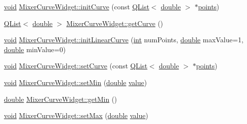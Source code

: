 \begin{DoxyCompactItemize}
\item 
\hyperlink{group___u_a_v_objects_plugin_ga444cf2ff3f0ecbe028adce838d373f5c}{void} \hyperlink{group___u_a_v_object_widget_utils_gaa776ac520f82de83862c18af0ff99ce3}{Mixer\-Curve\-Widget\-::init\-Curve} (const \hyperlink{class_q_list}{Q\-List}$<$ \hyperlink{_super_l_u_support_8h_a8956b2b9f49bf918deed98379d159ca7}{double} $>$ $\ast$\hyperlink{glext_8h_ae75d9f560170dfeaadc8718c87f5fbec}{points})
\item 
\hyperlink{class_q_list}{Q\-List}$<$ \hyperlink{_super_l_u_support_8h_a8956b2b9f49bf918deed98379d159ca7}{double} $>$ \hyperlink{group___u_a_v_object_widget_utils_gad97c9f7b189fc9097da50ab5b8f08f4d}{Mixer\-Curve\-Widget\-::get\-Curve} ()
\item 
\hyperlink{group___u_a_v_objects_plugin_ga444cf2ff3f0ecbe028adce838d373f5c}{void} \hyperlink{group___u_a_v_object_widget_utils_gad0a76288e7cbdf09fb112176d236dfde}{Mixer\-Curve\-Widget\-::init\-Linear\-Curve} (\hyperlink{ioapi_8h_a787fa3cf048117ba7123753c1e74fcd6}{int} num\-Points, \hyperlink{_super_l_u_support_8h_a8956b2b9f49bf918deed98379d159ca7}{double} max\-Value=1, \hyperlink{_super_l_u_support_8h_a8956b2b9f49bf918deed98379d159ca7}{double} min\-Value=0)
\item 
\hyperlink{group___u_a_v_objects_plugin_ga444cf2ff3f0ecbe028adce838d373f5c}{void} \hyperlink{group___u_a_v_object_widget_utils_ga0738fd8e0cf67713c6553da77c284a71}{Mixer\-Curve\-Widget\-::set\-Curve} (const \hyperlink{class_q_list}{Q\-List}$<$ \hyperlink{_super_l_u_support_8h_a8956b2b9f49bf918deed98379d159ca7}{double} $>$ $\ast$\hyperlink{glext_8h_ae75d9f560170dfeaadc8718c87f5fbec}{points})
\item 
\hyperlink{group___u_a_v_objects_plugin_ga444cf2ff3f0ecbe028adce838d373f5c}{void} \hyperlink{group___u_a_v_object_widget_utils_ga78338911bd3605c13be6672b2a94d346}{Mixer\-Curve\-Widget\-::set\-Min} (\hyperlink{_super_l_u_support_8h_a8956b2b9f49bf918deed98379d159ca7}{double} \hyperlink{glext_8h_aa0e2e9cea7f208d28acda0480144beb0}{value})
\item 
\hyperlink{_super_l_u_support_8h_a8956b2b9f49bf918deed98379d159ca7}{double} \hyperlink{group___u_a_v_object_widget_utils_gac199a42260bf4a3ddd42f23bae109569}{Mixer\-Curve\-Widget\-::get\-Min} ()
\item 
\hyperlink{group___u_a_v_objects_plugin_ga444cf2ff3f0ecbe028adce838d373f5c}{void} \hyperlink{group___u_a_v_object_widget_utils_ga5575aabae9b71223eefe3e0a2ad39191}{Mixer\-Curve\-Widget\-::set\-Max} (\hyperlink{_super_l_u_support_8h_a8956b2b9f49bf918deed98379d159ca7}{double} \hyperlink{glext_8h_aa0e2e9cea7f208d28acda0480144beb0}{value})

\end{DoxyCompactItemize}
